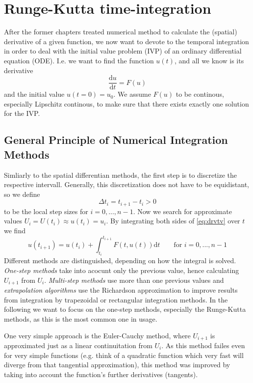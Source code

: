 \section{Runge-Kutta time-integration}

After the former chapters treated numerical method to calculate the (spatial) derivative of a given function, we now want to devote to the temporal integration in order to deal with the initial value problem (IVP) of an ordinary differential equation (ODE). I.e. we want to find the function $u(t)$, and all we know is its derivative
\begin{equation}
  \frac{\mathrm{d} u}{\mathrm{d} t} = F(u)
  \label{eq:drvtv}
\end{equation}
and the initial value $u(t = 0) = u_0$.
We assume $F(u)$ to be continous, especially Lipschitz continous, to make sure that there exists exactly one solution for the IVP.
\subsection{General Principle of Numerical Integration Methods}
Simliarly to the spatial differentian methods, the first step is to discretize the respective intervall. Generally, this discretization does not have to be equidistant, so we define
\begin{equation}
  \Delta t_i = t_{i+1} - t_i >0
\end{equation}
to be the local step sizes for $i = 0,..., n-1$.
Now we search for approximate values $U_i = U(t_i) \approx u(t_i) = u_i$.
By integrating both sides of \ref{eq:drvtv} over $t$ we find
\begin{equation}
  u(t_{i+1}) = u(t_i) + \int_{t_i}^{t_{i+1}} F(t,u(t)) \mathrm{d}t \qquad \text{for } i = 0,...,n-1
\end{equation}
Different methods are distinguished, depending on how the integral is solved. \emph{One-step methods} take into acocunt only the previous value, hence calculating $U_{i+1}$ from $U_i$. \emph{Multi-step methods} use more than one previous values and \emph{extrapolation algorithms} use the Richardson approximation to improve results from integration by trapezoidal or rectangular integration methods.
In the following we want to focus on the one-step methods, especially the Runge-Kutta methods, as this is the most common one in usage.

One very simple approach is the Euler-Cauchy method, where $U_{i+1}$ is approximated just as a linear continuitation from $U_i$. As this method failes even for very simple functions (e.g. think of a quadratic function which very fast will diverge from that tangential approximation), this method was improved by taking into account the function's further derivatives (tangents).

